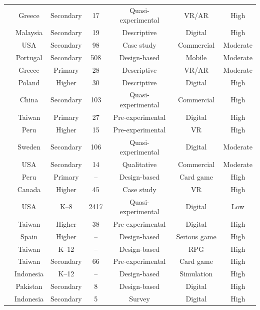 \documentclass[a4paper,fleqn]{cas-sc}
\begin{document}
\begin{longtable}{|p{4.6cm}|c|c|c|c|c|c|}
\citet{1Barbatsis201159} & Greece & Secondary & 17 & Quasi-experimental & VR/AR & High \\
\citet{2Mahamarowi2023133} & Malaysia & Secondary & 19 & Descriptive & Digital & High \\
\citet{3Watson2011466} & USA & Secondary & 98 & Case study & Commercial & Moderate \\
\citet{4Cruz2017} & Portugal & Secondary & 508 & Design-based & Mobile & Moderate \\
\citet{5kazanidis2018alpha} & Greece & Primary & 28 & Descriptive & VR/AR & Moderate \\
\citet{6Czerwinski2018} & Poland & Higher & 30 & Descriptive & Digital & High \\
\citet{8Yu2014} & China & Secondary & 103 & Quasi-experimental & Commercial & High \\
\citet{9Lin2018} & Taiwan & Primary & 27 & Pre-experimental & Digital & High \\
\citet{10Huaman2019220} & Peru & Higher & 15 & Pre-experimental & VR & High \\
\citet{11Ternblad2023115} & Sweden & Secondary & 106 & Quasi-experimental & Digital & Moderate \\
\citet{12Gilbert2019108} & USA & Secondary & 14 & Qualitative & Commercial & Moderate \\
\citet{13Humpire2022} & Peru & Primary & -- & Design-based & Card game & High \\
\citet{14Forsyth2023} & Canada & Higher & 45 & Case study & VR & High \\
\citet{15Slater2022} & USA & K--8 & 2417 & Quasi-experimental & Digital & Low \\
\citet{16Chen201447} & Taiwan & Higher & 38 & Pre-experimental & Digital & High \\
\citet{17Manzanares2019} & Spain & Higher & -- & Design-based & Serious game & High \\
\citet{18Shih201054} & Taiwan & K--12 & -- & Design-based & RPG & High \\
\citet{19Chou2019} & Taiwan & Secondary & 66 & Pre-experimental & Card game & High \\
\citet{20Erandaru2014} & Indonesia & K--12 & -- & Design-based & Simulation & High \\
\citet{21Ghulamani2017} & Pakistan & Secondary & 8 & Design-based & Digital & High \\
\citet{22Nugroho2020149} & Indonesia & Secondary & 5 & Survey & Digital & High \\

\end{longtable}
\end{document}
